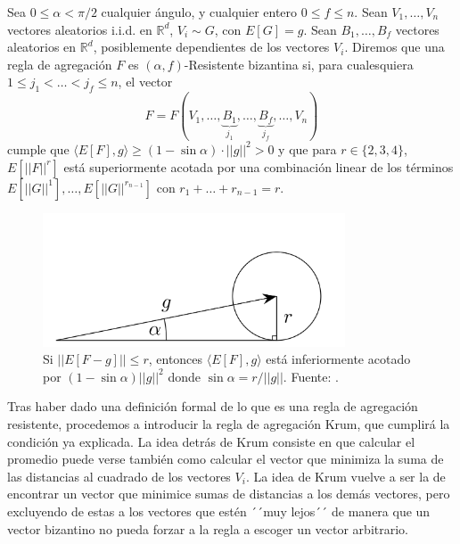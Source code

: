 \begin{definition}
	Sea $0 \le \alpha < \pi/2$ cualquier ángulo, y cualquier entero $0 \le f \le n$. Sean $V_1, \ldots, V_n$ vectores aleatorios \ac{i.i.d.} en $\mathbb{R}^d$, $V_i \sim G$, con $E[G]=g$. Sean $B_1, \ldots, B_f$ vectores aleatorios en $\mathbb{R}^d$, posiblemente dependientes de los vectores $V_i$. Diremos que una regla de agregación $F$ es $(\alpha, f)$-Resistente bizantina si, para cualesquiera $1 \le j_1 < \ldots < j_f \le n$, el vector
	\begin{equation}
		F = F(V_1, \dots, \underbrace{B_1}_{j_1}, \ldots, \underbrace{B_f}_{j_f}, \ldots, V_n)
	\end{equation}
	cumple que $\langle E[F], g \rangle \ge (1-\sin \alpha) \cdot ||g||^2 > 0$ y que para $r \in \{ 2, 3, 4\}$, $E[||F||^r]$ está superiormente acotada por una combinación linear de los términos $E[||G||^1], \ldots, E[||G||^{r_{n-1}}]$ con $r_1 + \ldots + r_{n-1}=r$.
\end{definition}

\begin{figure}[h]
    \centering
    \includegraphics[width=0.8\textwidth]{figuras/krum_angle.png}
    \caption{Si $||E[F-g]|| \le r$, entonces $\langle E[F], g \rangle$ está inferiormente acotado por $(1- \sin \alpha)||g||^2$ donde $\sin \alpha= r/ ||g||$. Fuente: \cite{krum-2017}.}
    \label{fig:krumangle}
\end{figure}

Tras haber dado una definición formal de lo que es una regla de agregación resistente, procedemos a introducir la regla de agregación Krum, que cumplirá la condición ya explicada. La idea detrás de Krum consiste en que calcular el promedio puede verse también como calcular el vector que minimiza la suma de las distancias al cuadrado de los vectores $V_i$. La idea de Krum vuelve a ser la de encontrar un vector que minimice sumas de distancias a los demás vectores, pero excluyendo de estas a los vectores que estén ´´muy lejos´´ de manera que un vector bizantino no pueda forzar a la regla a escoger un vector arbitrario.

